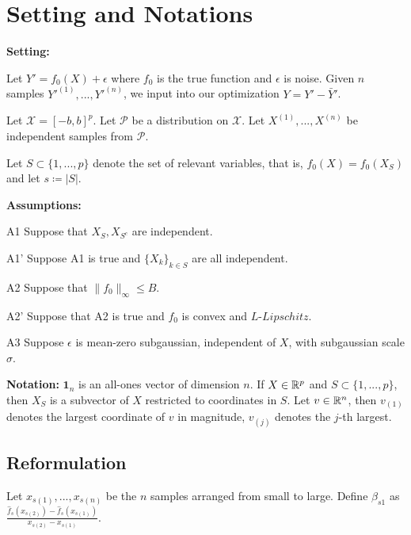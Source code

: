 \documentclass{article}
\begin{document}
\section{Setting and Notations}

\textbf{Setting:}
\begin{packed_enum}
\item Let $Y' = f_0(X) + \epsilon$ where $f_0$ is the true function and $\epsilon$ is noise.  Given $n$ samples $Y'^{(1)},...,Y'^{(n)}$, we input into our optimization $Y = Y' - \bar{Y}'$.
\item Let $\mathcal{X} = [-b, b]^p$. Let $\mathcal{P}$ be a distribution on $\mathcal{X}$. Let $X^{(1)},..., X^{(n)} $ be independent samples from $\mathcal{P}$. 
\item Let $S \subset \{1,...,p\}$ denote the set of relevant variables, that is, $f_0(X) = f_0(X_S)$ and let $s \coloneqq |S|$.
\end{packed_enum}

\textbf{Assumptions:}
\begin{packed_enum}
\item[A1] Suppose that $X_S, X_{S^c}$ are independent.
\item[A1'] Suppose A1 is true and $\{ X_k \}_{k \in S}$ are all independent. 
\item[A2] Suppose that $\|f_0\|_\infty \leq B$.
\item[A2'] Suppose that A2 is true and $f_0$ is convex and $L$-$Lipschitz$.
\item[A3] Suppose $\epsilon$ is mean-zero subgaussian, independent of $X$, with subgaussian scale $\sigma$.
\end{packed_enum}

\textbf{Notation:}
$\mathbf{1}_n$ is an all-ones vector of dimension $n$. If $X \in \mathbb{R}^p$ and $S \subset \{1,...,p\}$, then $X_S$ is a subvector of $X$ restricted to coordinates in $S$. Let $v \in \mathbb{R}^n$, then $v_{(1)}$ denotes the largest coordinate of $v$ in magnitude, $v_{(j)}$ denotes the $j$-th largest. \\

\subsection{Reformulation}

Let $x_{s(1)} ,..., x_{s(n)}$ be the $n$ samples arranged from small to large. Define $\hat{\beta}_{s1}$ as $\frac{\hat{f}_s(x_{s(2)}) - \hat{f}_s(x_{s(1)})}{x_{s(2)} - x_{s(1)}}$.\\
\end{document}
